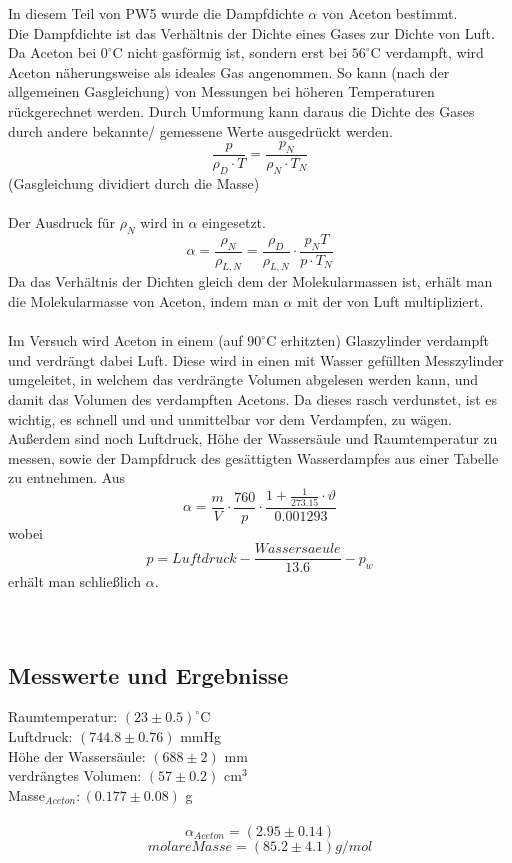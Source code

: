 \documentclass[12pt,a4paper]{article}
\begin{document}
\begin{multicols}{2}
In diesem Teil von PW5 wurde die Dampfdichte $\alpha$ von Aceton bestimmt.\\
Die Dampfdichte ist das Verhältnis der Dichte eines Gases zur Dichte von Luft. Da Aceton bei $0 ^\circ$C nicht gasförmig ist, sondern erst bei $56^\circ$C verdampft, wird Aceton näherungsweise als ideales Gas angenommen. So kann (nach der allgemeinen Gasgleichung) von Messungen bei höheren Temperaturen rückgerechnet werden. Durch Umformung kann daraus die Dichte des Gases durch andere bekannte/ gemessene Werte ausgedrückt werden.
$$\frac{p}{\rho_D \cdot T}= \frac{p_N}{\rho_N \cdot T_N}$$ 
(Gasgleichung dividiert durch die Masse)\\
\\
Der Ausdruck für $\rho_N$ wird in $\alpha$ eingesetzt.
$$\alpha = \frac{\rho_N}{\rho_{L,N}}=\frac{\rho_D}{\rho_{L,N}} \cdot \frac{p_N T}{p \cdot T_N}$$
Da das Verhältnis der Dichten gleich dem der Molekularmassen ist, erhält man die Molekularmasse von Aceton, indem man $\alpha$ mit der von Luft multipliziert.\\
\\
Im Versuch wird Aceton in einem (auf $90^\circ$C erhitzten) Glaszylinder verdampft und verdrängt dabei Luft. Diese wird in einen mit Wasser gefüllten Messzylinder umgeleitet, in welchem das verdrängte Volumen abgelesen werden kann, und damit das Volumen des verdampften Acetons.
Da dieses rasch verdunstet, ist es wichtig, es schnell und und unmittelbar vor dem Verdampfen, zu wägen.\\
Außerdem sind noch Luftdruck, Höhe der Wassersäule und Raumtemperatur zu messen, sowie der Dampfdruck des gesättigten Wasserdampfes aus einer Tabelle zu entnehmen. Aus
$$\alpha = \frac{m}{V} \cdot \frac{760}{p} \cdot \frac{1 + \frac{1}{273.15} \cdot \vartheta}{0.001293}$$
wobei
$$p= Luftdruck - \frac{Wassersaeule}{13.6} - p_w$$
erhält man schließlich $\alpha$.\\
\\
\\


\subsection{Messwerte und Ergebnisse}

Raumtemperatur: $(23\pm 0.5)^\circ$C\\
Luftdruck: $(744.8 \pm 0.76)$ mmHg\\
Höhe der Wassersäule: $(688 \pm 2)$ mm\\
verdrängtes Volumen: $(57 \pm 0.2)$ cm$^3$\\
Masse$_{Aceton}: (0.177 \pm 0.08)$ g\\
\\
$$\alpha_{Aceton} = (2.95 \pm 0.14)$$
$$molare Masse = (85.2 \pm 4.1) g/mol$$\\
\\
\\




\end{multicols}
\end{document}
